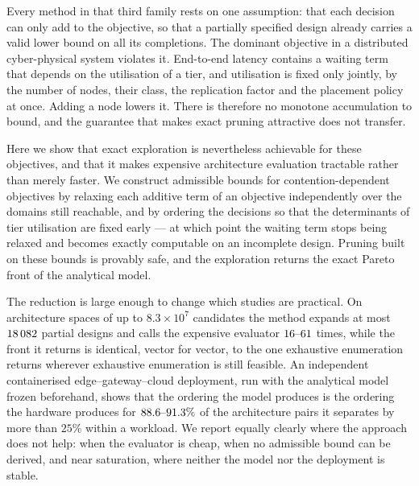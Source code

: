 Every method in that third family rests on one assumption: that each decision can only
add to the objective, so that a partially specified design already carries a valid lower
bound on all its completions. The dominant objective in a distributed cyber-physical
system violates it. End-to-end latency contains a waiting term that depends on the
utilisation of a tier, and utilisation is fixed only jointly, by the number of nodes,
their class, the replication factor and the placement policy at once. Adding a node
lowers it. There is therefore no monotone accumulation to bound, and the guarantee that
makes exact pruning attractive does not transfer.

Here we show that exact exploration is nevertheless achievable for these objectives, and
that it makes expensive architecture evaluation tractable rather than merely faster. We
construct admissible bounds for contention-dependent objectives by relaxing each additive
term of an objective independently over the domains still reachable, and by ordering the
decisions so that the determinants of tier utilisation are fixed early --- at which point
the waiting term stops being relaxed and becomes exactly computable on an incomplete
design. Pruning built on these bounds is provably safe, and the exploration returns the
exact Pareto front of the analytical model.

The reduction is large enough to change which studies are practical. On
architecture spaces of up to $8.3\times10^{7}$ candidates the method expands at most
$18\,082$ partial designs and calls the expensive evaluator $16\text{--}61$ times, while the
front it returns is identical, vector for vector, to the one exhaustive enumeration
returns wherever exhaustive enumeration is still feasible. An independent containerised
edge--gateway--cloud deployment, run with the analytical model frozen beforehand, shows
that the ordering the model produces is the ordering the hardware produces for
$88.6\text{--}91.3\%$ of the architecture pairs it separates by more than $25\%$
within a workload. We report equally clearly where the approach does not help: when the evaluator
is cheap, when no admissible bound can be derived, and near saturation, where neither the
model nor the deployment is stable.
